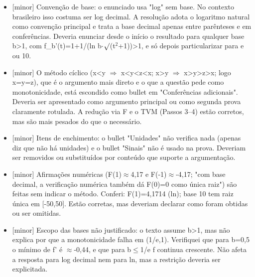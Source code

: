 \documentclass{article}%
\begin{document}
\begin{itemize}%
\item%
{[}minor{]} Convenção de base: o enunciado usa "log" sem base. No contexto brasileiro isso costuma ser log decimal. A resolução adota o logaritmo natural como convenção principal e trata a base decimal apenas entre parênteses e em conferências. Deveria enunciar desde o início o resultado para qualquer base b>1, com f\_b'(t)=1+1/(ln b$\cdot$$\surd$(t$^2$+1))>1, e só depois particularizar para e ou 10.%
\item%
{[}minor{]} O método cíclico (x<y $\Rightarrow$ x<y<z<x; x>y $\Rightarrow$ x>y>z>x; logo x=y=z), que é o argumento mais direto e o que a questão pede como monotonicidade, está escondido como bullet em "Conferências adicionais". Deveria ser apresentado como argumento principal ou como segunda prova claramente rotulada. A redução via F e o TVM (Passos 3--4) estão corretos, mas são mais pesados do que o necessário.%
\item%
{[}minor{]} Itens de enchimento: o bullet "Unidades" não verifica nada (apenas diz que não há unidades) e o bullet "Sinais" não é usado na prova. Deveriam ser removidos ou substituídos por conteúdo que suporte a argumentação.%
\item%
{[}minor{]} Afirmações numéricas (F(1)$\approx$4,17 e F(-1)$\approx$-4,17; "com base decimal, a verificação numérica também dá F(0)=0 como única raiz") são feitas sem indicar o método. Conferi: F(1)=4,1714 (ln); base 10 tem raiz única em {[}-50,50{]}. Estão corretas, mas deveriam declarar como foram obtidas ou ser omitidas.%
\item%
{[}minor{]} Escopo das bases não justificado: o texto assume b>1, mas não explica por que a monotonicidade falha em (1/e,1). Verifiquei que para b=0,5 o mínimo de f' é $\approx$-0,44, e que para b$\leq$1/e f continua crescente. Não afeta a resposta para log decimal nem para ln, mas a restrição deveria ser explicitada.%
\end{itemize}%
\end{document}
